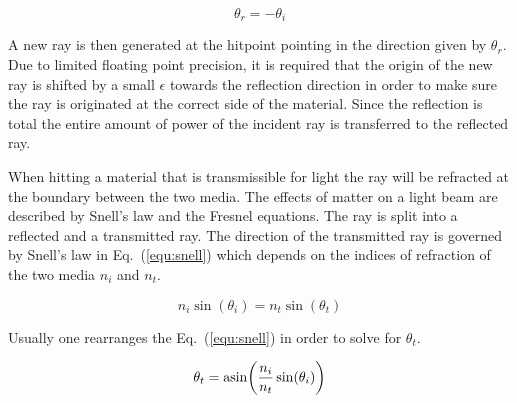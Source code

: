 \documentclass[a4paper,10pt]{article}
\newcommand{\equref}[1]{Eq.~(\ref{#1})}
\begin{document}
    \begin{equation}
        \label{equ:reflection}
        \theta_r = -\theta_i
    \end{equation}

    A new ray is then generated at the hitpoint pointing in the direction
    given by $\theta_r$.
    Due to limited floating point precision, it is required that the origin
    of the new ray is shifted by a small $\epsilon$ towards the 
    reflection direction in order to make sure the ray is originated at the
    correct side of the material.
    Since the reflection is total the entire amount of power of the incident
    ray is transferred to the reflected ray.

    When hitting a material that is transmissible for light the ray
    will be refracted at the boundary between the two media.
    The effects of matter on a light beam are described by Snell's law
    and the Fresnel equations.
    The ray is split into a reflected and a transmitted ray.
    The direction of the transmitted ray is governed by Snell's law in \equref{equ:snell}
    which depends on the indices of refraction of the two media $n_i$ and $n_t$.

    \begin{equation}
        \label{equ:snell}
        n_i \sin(\theta_i) = n_t \sin(\theta_t)
    \end{equation}

    Usually one rearranges the \equref{equ:snell} in order to solve
    for $\theta_t$.
    
    \begin{equation}
        \label{equ:snell_rearranged}
        \theta_t = \asin(\frac{n_i}{n_t} \sin(\theta_i))
    \end{equation}
\end{document}
